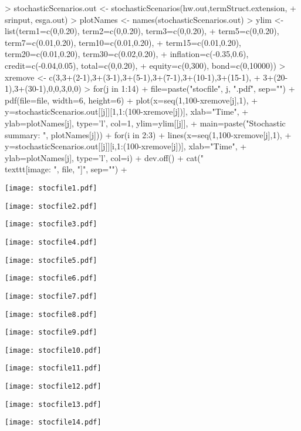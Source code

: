 \documentclass[12pt]{article}
\begin{document}
\begin{Schunk}
\begin{Sinput}
> stochasticScenarios.out <- stochasticScenarios(hw.out,termStruct.extension,
+   srinput, esga.out)
> plotNames <- names(stochasticScenarios.out)
> ylim <- list(term1=c(0,0.20), term2=c(0,0.20), term3=c(0,0.20), 
+   term5=c(0,0.20), term7=c(0.01,0.20), term10=c(0.01,0.20), 
+   term15=c(0.01,0.20), term20=c(0.01,0.20), term30=c(0.02,0.20),
+   inflation=c(-0.35,0.6), credit=c(-0.04,0.05), total=c(0,0.20), 
+   equity=c(0,300), bond=c(0,10000))
> xremove <- c(3,3+(2-1),3+(3-1),3+(5-1),3+(7-1),3+(10-1),3+(15-1),
+   3+(20-1),3+(30-1),0,0,3,0,0)
> for(j in 1:14) {
+   file=paste("stocfile", j, ".pdf", sep="")  
+   pdf(file=file, width=6, height=6)  
+   plot(x=seq(1,100-xremove[j],1),
+     y=stochasticScenarios.out[[j]][1,1:(100-xremove[j])], xlab="Time", 
+     ylab=plotNames[j], type='l', col=1, ylim=ylim[[j]], 
+     main=paste("Stochastic summary: ", plotNames[j]))
+   for(i in 2:3)
+     lines(x=seq(1,100-xremove[j],1),
+       y=stochasticScenarios.out[[j]][i,1:(100-xremove[j])], xlab="Time", 
+       ylab=plotNames[j], type='l', col=i)
+   dev.off()  
+   cat("\\texttt{[image: ", file, "]}\n\n", sep="")  
+ }
\end{Sinput}
\texttt{[image: stocfile1.pdf]}

\texttt{[image: stocfile2.pdf]}

\texttt{[image: stocfile3.pdf]}

\texttt{[image: stocfile4.pdf]}

\texttt{[image: stocfile5.pdf]}

\texttt{[image: stocfile6.pdf]}

\texttt{[image: stocfile7.pdf]}

\texttt{[image: stocfile8.pdf]}

\texttt{[image: stocfile9.pdf]}

\texttt{[image: stocfile10.pdf]}

\texttt{[image: stocfile11.pdf]}

\texttt{[image: stocfile12.pdf]}

\texttt{[image: stocfile13.pdf]}

\texttt{[image: stocfile14.pdf]}\end{Schunk}
\end{document}
